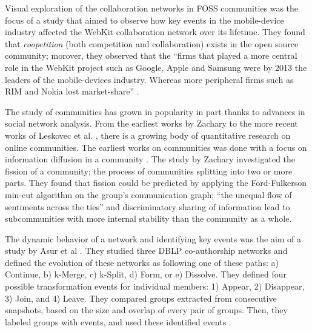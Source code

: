 \documentclass{report}
\begin{document}
Visual exploration of the collaboration networks in FOSS communities was the focus of a study that aimed to observe how key events in the mobile-device industry affected the WebKit collaboration network over its lifetime. \cite{JoseWebKit} They found that \textit{coopetition} (both competition and collaboration) exists in the open source community; morover, they observed that the ``firms that played a more central role in the WebKit project such as Google, Apple and Samsung were by 2013 the leaders of the mobile-devices industry. Whereas more peripheral firms such as RIM and Nokia lost market-share'' \cite{JoseWebKit}. 

The study of communities has grown in popularity in part thanks to advances in social network analysis.  From the earliest works by Zachary \cite{Zachary} to the more recent works of Leskovec et al. \cite{LeskovecGraphsOverTime}\cite{LeskovecStatisticalPropertiesOfCommunityStructure}, there is a growing body of quantitative research on online communities. The earliest works on communities was done with a focus on information diffusion in a community \cite{Zachary}. The study by Zachary investigated the fission of a community; the process of communities splitting into two or more parts. They found that fission could be predicted by applying the Ford-Fulkerson min-cut algorithm \cite{Ford} on the group's communication graph; ``the unequal flow of sentiments across the ties'' and discriminatory sharing of information lead to subcommunities with more internal stability than the community as a whole.\cite{Zachary}

The dynamic behavior of a network and identifying key events was the aim of a study by Asur et al \cite{Asur}. They studied three DBLP co-authorship networks and defined the evolution of these networks as following one of these paths: a) Continue, b) k-Merge, c) k-Split, d) Form, or e) Dissolve. They defined four possible transformation events for individual members: 1) Appear, 2) Disappear, 3) Join, and 4) Leave. They compared groups extracted from consecutive snapshots, based on the size and overlap of every pair of groups. Then, they labeled groups with events, and used these identified events \cite{Asur}.
\end{document}
